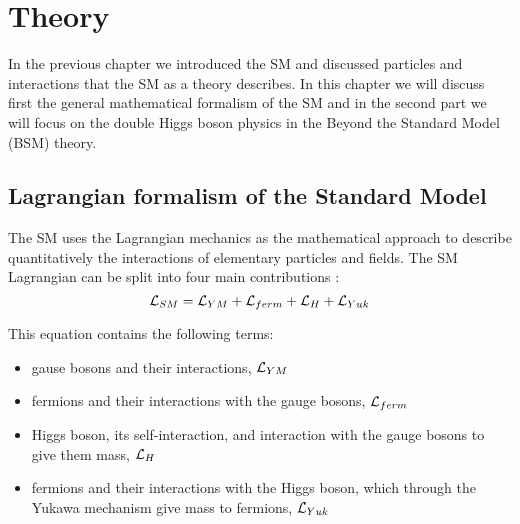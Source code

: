 
\chapter{Theory}
\label{ch:theory}

In the previous chapter we introduced the SM and discussed particles and interactions that the SM as a theory describes. In this chapter we will discuss first the general mathematical formalism of the SM and in the second part we will focus on the double Higgs boson physics in the Beyond the Standard Model (BSM) theory.


\section{Lagrangian formalism of the Standard Model}


The SM uses the Lagrangian mechanics as the mathematical approach to describe quantitatively the interactions of elementary particles and fields. 
The SM Lagrangian can be split into four main contributions \cite{Mozer:2016wzi}:
\begin{equation}\label{lagr_SM}
\mathcal{L}_{SM} = \mathcal{L}_{YM} + \mathcal{L}_{ferm} + \mathcal{L}_{H} + \mathcal{L}_{Yuk} 
\end{equation}

This equation contains the following terms:

\begin{itemize}
\item gause bosons and their interactions, $\mathcal{L}_{YM} $
\item fermions and their interactions with the gauge bosons, $\mathcal{L}_{ferm}$
\item Higgs boson, its self-interaction, and interaction with the gauge bosons to give them mass, $\mathcal{L}_{H}$%
\item fermions and their interactions with the Higgs boson, which through the Yukawa mechanism give mass to fermions, $\mathcal{L}_{Yuk} $
\end{itemize}
 


